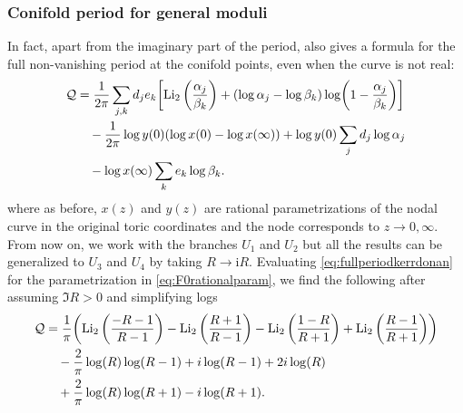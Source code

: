 \documentclass[11pt, a4paper]{article}
\newcommand{\ii}{\mathrm{i}}
\newcommand{\Li}{\operatorname{Li}}
\numberwithin{equation}{section}
\begin{document}
\subsubsection{Conifold period for general moduli}
In fact, apart from the imaginary part of the period, \cite[eq. (4.12)]{kerr2008} also gives a formula for the full non-vanishing period at the conifold points, even when the curve is not real:
\begin{equation}\label{eq:fullperiodkerrdonan}
\begin{aligned}
  \mathcal{Q} &= \frac{1}{2\pi} \sum_{j, k} d_j e_k \qty[ \Li_2\qty(\frac{\alpha_j}{\beta_k}) + \qty(\log \alpha_j - \log \beta_k) \log(1 - \frac{\alpha_j}{\beta_k}) ] \\
  &\quad -\frac{1}{2\pi} \log y(0) \qty(\log x(0) - \log x(\infty))
  + \log y(0) \sum_j d_j \log \alpha_j \\
  &\quad - \log x(\infty) \sum_k e_k \log \beta_k.
\end{aligned}
\end{equation}
where as before, $x(z)$ and $y(z)$ are rational parametrizations of the nodal curve in the original toric coordinates and the node corresponds to $z \to 0, \infty$.
From now on, we work with the branches $U_1$ and $U_2$ but all the results can be generalized to $U_3$ and $U_4$ by taking $R \to \ii R$.
Evaluating \cref{eq:fullperiodkerrdonan} for the parametrization in \cref{eq:F0rationalparam}, we find the following after assuming $\Im R > 0$ and simplifying logs
\begin{equation}
  \begin{aligned}
    \mathcal{Q} &= \frac{1}{\pi} \qty(\Li_2\left(\frac{-R-1}{R-1}\right)-\Li_2\left(\frac{R+1}{R-1}\right)-\Li_2\left(\frac{1-R}{R+1}\right)+\Li_2\left(\frac{R-1}{R+1}\right)) \\
    &\quad -\frac{2}{\pi} \log (R) \log (R-1)+i  \log (R-1)+2 i  \log (R)\\
    &\quad +\frac{2}{\pi} \log (R) \log (R+1)-i  \log (R+1).
    \end{aligned}
\end{equation}
\end{document}
